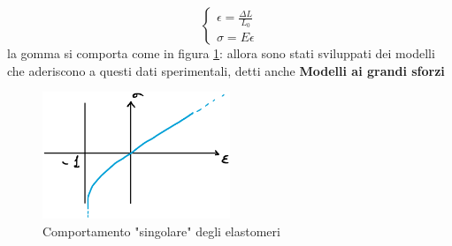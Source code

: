\begin{equation}
\begin{cases}
\epsilon = \frac{\Delta L}{L_0}\\
\sigma = E\epsilon
\end{cases}
\end{equation}
la gomma si comporta come in figura \ref{fig:ComportamentoElastomeri}: allora sono stati sviluppati dei modelli che aderiscono a questi dati sperimentali, detti anche \textbf{Modelli ai grandi sforzi}
\begin{figure}
\centering
\includegraphics[width = 0.5\textwidth]{gfx/ComportamentoElastomeri}
\caption{Comportamento "singolare" degli elastomeri}
\label{fig:ComportamentoElastomeri}
\end{figure}